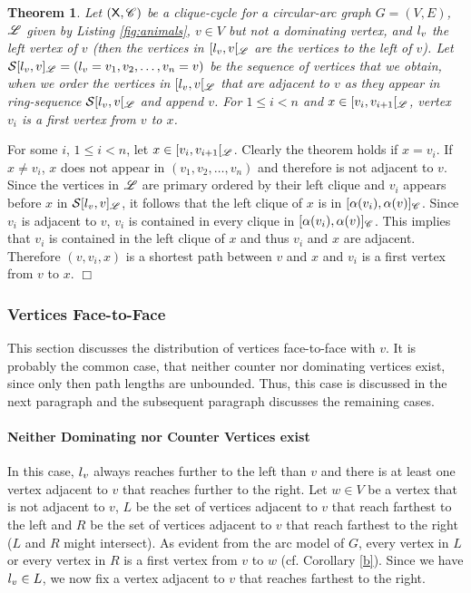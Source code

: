 \documentclass[10pt]{article}
\newtheorem{theorem}{Theorem}[section]
\newenvironment{proof}{\noindent{\bf Proof~}}{\null\hfill $\Box$\par\medskip}
\newcommand{\cordered}{\fu{S}}\newcommand{\lvi}[2]{\lv{}^{#2}(#1)}\newcommand{\rvi}[2]{\rv{}^{#2}(#1)}\newcommand{\lvd}[1]{\fu{L}_v(#1)}\newcommand{\rvd}[1]{\fu{R}_v(#1)}
\begin{document}
\begin{theorem}\label{theototheleft}
Let $(\mathsf{X},\mathscr{C})$ be a clique-cycle for a circular-arc graph $G=(V,E)$, $\mathscr{L}$ 
given by Listing \ref{fig:animals}, $v\in V$ but not a dominating vertex, and $l_{v}$ 
the left vertex of $v$ (then the vertices in $[l_{v},v[_{\mathscr{L}}$ are the vertices to 
the left of $v$).
Let $\cordered[\lvv,v]_\ri{L}=(\lvv=v_1,v_2,\ldots,v_n=v)$ be the sequence of vertices that we obtain, when we order the vertices in $[l_{v},v[_{\mathscr{L}}$ that are adjacent to $v$ as they appear in ring-sequence $\cordered[\lvv,v[_\ri{L}$ and append $v$.
For $1\leq i<n$ and $x\in[v_i,v_{i+1}[_{\mathscr{L}}$, vertex $v_i$ is a first vertex 
from $v$ to $x$.
\end{theorem}



\begin{proof}
For some $i$, $1\leq i<n$, let $x\in[v_i,v_{i+1}[_{\mathscr{L}}$.
Clearly the theorem holds if $x=v_i$.
If $x\neq v_i$, $x$ does not appear in $(v_1,v_2,\ldots,v_n)$ and therefore is not 
adjacent to $v$. Since the vertices in $\mathscr{L}$ are primary ordered by their left clique 
and $v_i$ appears before $x$ in $\cordered[\lvv,v]_\ri{L}$, it follows that the left 
clique of $x$ is in $[\alpha(v_i),\alpha(v)]_{\mathscr{C}}$. Since $v_i$ is adjacent to $v$, $v_i$ 
is contained in every clique in $[\alpha(v_i),\alpha(v)]_{\mathscr{C}}$.
This implies that $v_i$ is contained in the left clique of $x$ and thus $v_i$ and $x$ 
are adjacent. Therefore $(v,v_i,x)$ is a shortest path between $v$ and $x$ and $v_i$ 
is a first vertex from $v$ to $x$.
\end{proof}






\subsubsection{Vertices Face-to-Face}\label{mvbislv}





This section discusses the distribution of vertices face-to-face with $v$.
It is probably the common case, that neither counter nor dominating vertices exist,
since only then path lengths are unbounded.
Thus, this case is discussed in the next paragraph and the 
subsequent paragraph discusses the remaining cases.


\paragraph{Neither Dominating nor Counter Vertices exist}\label{beideLeer}
In this case, $l_{v}$ always reaches further to the left than $v$ and there is at least 
one vertex adjacent to $v$ that reaches further to the right.
Let $w\in V$ be a vertex that is not adjacent to $v$, $L$ be the set of vertices adjacent to $v$ 
that reach farthest to the left and $R$ be the set of vertices adjacent to $v$ that reach 
farthest to the right ($L$ and $R$ might intersect).
As evident from the arc model of $G$, every vertex in $L$ or every vertex in $R$ 
is a first vertex from $v$ to $w$ (cf. Corollary \ref{b}).
Since we have $l_{v}\in L$, we now fix a vertex adjacent to $v$ that reaches farthest to the right.
\end{document}
